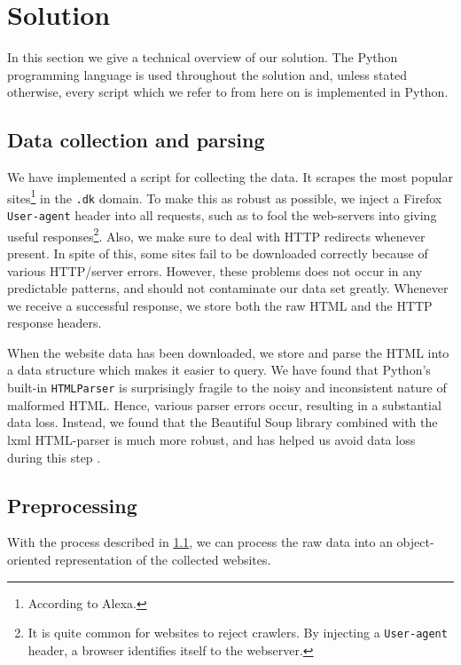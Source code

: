 \section{Solution}
\label{sec:solution}

In this section we give a technical overview of our solution. The {Python} programming language is used throughout the solution and, unless stated otherwise, every script which we refer to from here on is implemented in {Python}.

\subsection{Data collection and parsing}
\label{subsec:scraping}

We have implemented a script for collecting the data. It scrapes the most popular sites\footnote{According to Alexa.} in the \texttt{.dk} domain. To make this as robust as possible, we inject a Firefox \texttt{User-agent} header into all requests, such as to fool the web-servers into giving useful responses\footnote{It is quite common for websites to reject crawlers. By injecting a \texttt{User-agent} header, a browser identifies itself to the webserver.}. Also, we make sure to deal with {HTTP} redirects whenever present. In spite of this, some sites fail to be downloaded correctly because of various {HTTP}/server errors. However, these problems does not occur in any predictable patterns, and should not contaminate our data set greatly. Whenever we receive a successful response, we store both the raw {HTML} and the {HTTP} response headers.

When the website data has been downloaded, we store and parse the {HTML} into a data structure which makes it easier to query. We have found that {Python}'s built-in \texttt{HTMLParser} is surprisingly fragile to the noisy and inconsistent nature of malformed {HTML}. Hence, various parser errors occur, resulting in a substantial data loss. Instead, we found that the {Beautiful Soup} library combined with the {lxml} {HTML}-parser is much more robust, and has helped us avoid data loss during this step \cite{beautiful_soup, lxml}.

\subsection{Preprocessing}
\label{subsec:preprocessing}

With the process described in \ref{subsec:scraping}, we can process the raw data into an object-oriented representation of the collected websites.

